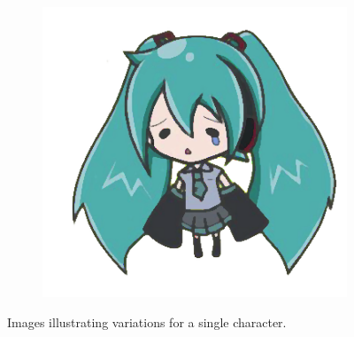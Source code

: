 \documentclass{beamer}
\begin{document}
\begin{frame}
\begin{figure}[htb!]
\begin{subfigure}{.3\textwidth}
\end{subfigure}
\begin{subfigure}{.3\textwidth}
\includegraphics[width=\textwidth]{../images/miku_d.png}
\end{subfigure}
\caption{Images illustrating variations for a single character.}
\label{fig:animationImagesVariations}
\end{figure}

\end{frame}
\end{document}
